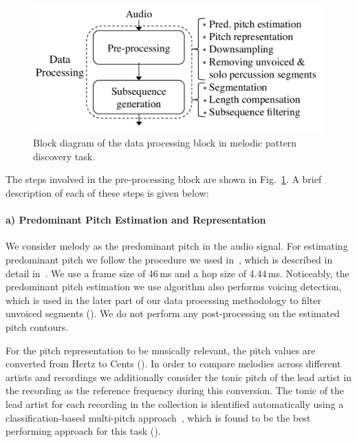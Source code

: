 \begin{figure}
	\begin{center}
		\includegraphics[width=\figSizeEightyFive]{ch06_patterns/figures/discovery/blockDiagram_DataProc.pdf}
	\end{center}
	\caption{Block diagram of the data processing block in melodic pattern discovery task.}
	\label{fig:pattern_discovery_preprocessing_block_diagram}
\end{figure}


The steps involved in the pre-processing block are shown in Fig.~\ref{fig:pattern_discovery_preprocessing_block_diagram}. A brief description of each of these steps is given below:

\paragraph{a) Predominant Pitch Estimation and Representation} 

We consider melody as the predominant pitch in the audio signal. For estimating predominant pitch we follow the procedure we used in~, which is described in detail in~. We use a frame size of 46\,ms and a hop size of 4.44\,ms. Noticeably, the predominant pitch estimation we use algorithm also performs voicing detection, which is used in the later part of our data processing methodology to filter unvoiced segments (). We do not perform any post-processing on the estimated pitch contours.

For the pitch representation to be musically relevant, the pitch values are converted from Hertz to Cents (). In order to compare melodies across different artists and recordings we additionally consider the tonic pitch of the lead artist in the recording as the reference frequency during this conversion. The tonic of the lead artist for each recording in the collection is identified automatically using a classification-based multi-pitch approach~\citep{salamon2012multipitch}, which is found to be the best performing approach for this task ().

